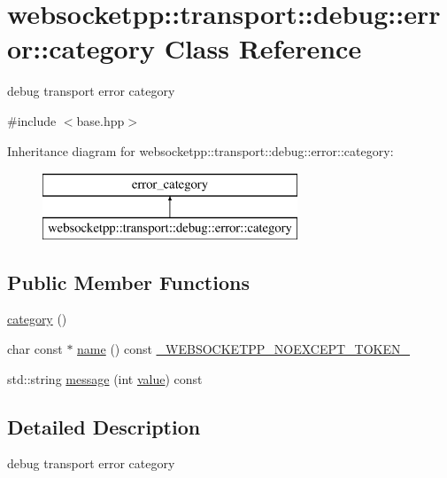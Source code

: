\hypertarget{classwebsocketpp_1_1transport_1_1debug_1_1error_1_1category}{}\section{websocketpp\+:\+:transport\+:\+:debug\+:\+:error\+:\+:category Class Reference}
\label{classwebsocketpp_1_1transport_1_1debug_1_1error_1_1category}


debug transport error category  




{\ttfamily \#include $<$base.\+hpp$>$}

Inheritance diagram for websocketpp\+:\+:transport\+:\+:debug\+:\+:error\+:\+:category\+:\begin{figure}[H]
\begin{center}
\leavevmode
\includegraphics[height=2.000000cm]{classwebsocketpp_1_1transport_1_1debug_1_1error_1_1category}
\end{center}
\end{figure}
\subsection*{Public Member Functions}
\begin{DoxyCompactItemize}
\item 
\hyperlink{classwebsocketpp_1_1transport_1_1debug_1_1error_1_1category_a11a0d735342c3f45ee519171d3c507cd}{category} ()
\item 
char const $\ast$ \hyperlink{classwebsocketpp_1_1transport_1_1debug_1_1error_1_1category_a19f55b05a90e1e825a4caabd86f8ce90}{name} () const \hyperlink{boost__config_8hpp_aa19747404a5f2fe9c9eb9e9d2e48f26c}{\+\_\+\+W\+E\+B\+S\+O\+C\+K\+E\+T\+P\+P\+\_\+\+N\+O\+E\+X\+C\+E\+P\+T\+\_\+\+T\+O\+K\+E\+N\+\_\+}
\item 
std\+::string \hyperlink{classwebsocketpp_1_1transport_1_1debug_1_1error_1_1category_a5e527f744880e4bb1befa21ca8fee6e8}{message} (int \hyperlink{namespacewebsocketpp_1_1transport_1_1debug_1_1error_a5ee6badaa3c5ebb600c4062394fac69c}{value}) const 
\end{DoxyCompactItemize}


\subsection{Detailed Description}
debug transport error category 

